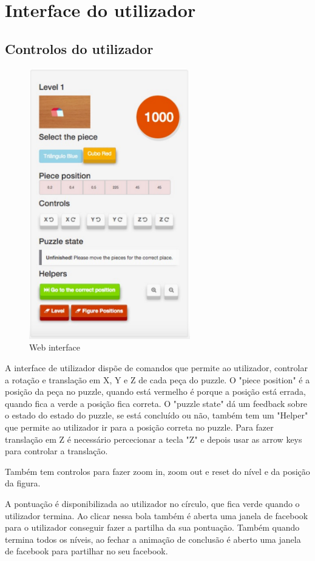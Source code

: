 \documentclass[pdftex,12pt,a4paper]{report}
\begin{document}
\section{Interface do utilizador}

\subsection{Controlos do utilizador}

\begin{figure}[!htb]
\center
 \includegraphics[width=70mm,scale=1]{webuserinterface.pdf}
 \caption{Web interface}
 \label{fig:web_interface}
\end{figure}

A interface de utilizador dispõe de comandos que permite ao utilizador, controlar a rotação e translação em X, Y e Z de cada peça do puzzle. O "piece position" é a posição da peça no puzzle, quando está vermelho é porque a posição está errada, quando fica a verde a posição fica correta. O "puzzle state" dá um feedback sobre o estado do estado do puzzle, se está concluído ou não, também tem um "Helper" que permite ao utilizador ir para a posição correta no puzzle. Para fazer translação em Z é necessário percecionar a tecla "Z" e depois usar as arrow keys para controlar a translação.

Também tem controlos para fazer zoom in, zoom out e reset do nível e da posição da figura.

A pontuação é disponibilizada ao utilizador no círculo, que fica verde quando o utilizador termina. Ao clicar nessa bola também é aberta uma janela de facebook para o utilizador conseguir fazer a partilha da sua pontuação. Também quando termina todos os níveis, ao fechar a animação de conclusão é aberto uma janela de facebook para partilhar no seu facebook.
\end{document}
